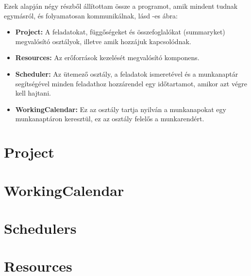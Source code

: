 Ezek alapján négy részből állítottam össze a programot, amik mindent tudnak egymásról, és folyamatosan kommunikálnak, lásd -es ábra:
\begin{itemize}
	\item \textbf{Project:} A feladatokat, függőségeket és összefoglalókat (summaryket) megvalósító osztályok, illetve amik hozzájuk kapcsolódnak.
	\item \textbf{Resources:} Az erőforrások kezelését megvalósító komponens.
	\item \textbf{Scheduler:} Az ütemező osztály, a feladatok ismeretével és a munkanaptár segítségével minden feladathoz hozzárendel egy időtartamot, amikor azt végre kell hajtani.
	\item \textbf{WorkingCalendar:}  Ez az osztály tartja nyilván a munkanapokat egy munkanaptáron keresztül, ez az osztály felelős a munkarendért.
\end{itemize}

\section{Project}

\section{WorkingCalendar}

\section{Schedulers}

\section{Resources}
